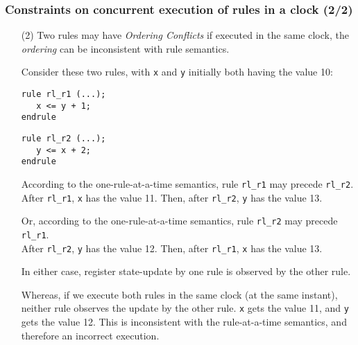 \begin{frame}[fragile]
\frametitle{Constraints on concurrent execution of rules in a clock (2/2)}

\footnotesize

\begin{itemize}

 \item[(2)] Two rules may have \emph{Ordering Conflicts} if executed
       in the same clock, {\ie} the \emph{ordering} can be
       inconsistent with rule semantics.

       \vspace{1ex}

       Consider these two rules, with {\tt x} and {\tt y} initially both having the value 10:

       \begin{center}
       \begin{minipage}{0.4\textwidth}
        {\footnotesize
        \begin{Verbatim}[frame=single]
rule rl_r1 (...);
   x <= y + 1;
endrule
        \end{Verbatim}
        }
       \end{minipage}
       \hmm
       \begin{minipage}{0.4\textwidth}
        {\footnotesize
        \begin{Verbatim}[frame=single]
rule rl_r2 (...);
   y <= x + 2;
endrule
        \end{Verbatim}
        }
       \end{minipage}
       \end{center}

       \vspace{1ex}

       According to the one-rule-at-a-time semantics,
       rule \verb|rl_r1| may precede \verb|rl_r2|. \\
       After \verb|rl_r1|, {\tt x} has the value 11.
       Then, after \verb|rl_r2|, {\tt y} has the value 13.

       \vspace{1ex}

       Or, according to the one-rule-at-a-time semantics,
       rule \verb|rl_r2| may precede \verb|rl_r1|. \\
       After \verb|rl_r2|, {\tt y} has the value 12.
       Then, after \verb|rl_r1|, {\tt x} has the value 13.

       \vspace{1ex}

       In either case, register state-update by one rule is observed
       by the other rule.

       \vspace{1ex}

       Whereas, if we execute both rules in the same clock (at the
       same instant), neither rule observes the update by the other
       rule. {\tt x} gets the value 11, and {\tt y} gets the value 12.
       This is inconsistent with the rule-at-a-time semantics, and
       therefore an incorrect execution.

\end{itemize}

\end{frame}

